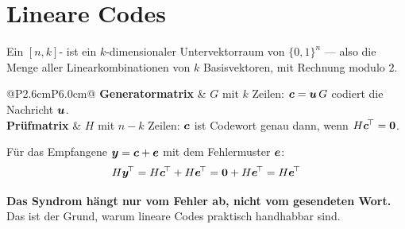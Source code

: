 \section{Lineare Codes}

\begin{definition}
Ein $[n,k]$- ist ein $k$-dimensionaler Untervektorraum von $\{0,1\}^n$ --- also die Menge aller Linearkombinationen von $k$ Basisvektoren, mit Rechnung modulo $2$.
\end{definition}

\begin{merksatz}
\begin{center}
{\small
\renewcommand{\arraystretch}{1.52}
\begin{tabular}{@{}P{2.6cm}P{6.0cm}@{}}
\toprule
\textbf{Generatormatrix} & $G$ mit $k$ Zeilen: $\boldsymbol{c} = \boldsymbol{u}\,G$ codiert die Nachricht $\boldsymbol{u}$.\\
\textbf{Prüfmatrix} & $H$ mit $n-k$ Zeilen: $\boldsymbol{c}$ ist Codewort genau dann, wenn $H\boldsymbol{c}^{\!\top} = \boldsymbol{0}$.\\
\bottomrule
\end{tabular}}
\end{center}

Für das Empfangene $\boldsymbol{y} = \boldsymbol{c}+\boldsymbol{e}$ mit dem Fehlermuster $\boldsymbol{e}$:
\[ H\boldsymbol{y}^{\!\top} = H\boldsymbol{c}^{\!\top} + H\boldsymbol{e}^{\!\top} = \boldsymbol{0} + H\boldsymbol{e}^{\!\top} = H\boldsymbol{e}^{\!\top} \]

\begin{center}
\begin{minipage}{0.9\textwidth}
\textbf{Das Syndrom hängt nur vom Fehler ab, nicht vom gesendeten Wort.} Das ist der Grund, warum lineare Codes praktisch handhabbar sind.
\end{minipage}
\end{center}

\begin{center}
\begin{minipage}{0.88\textwidth}
\end{minipage}
\end{center}


\end{merksatz}

